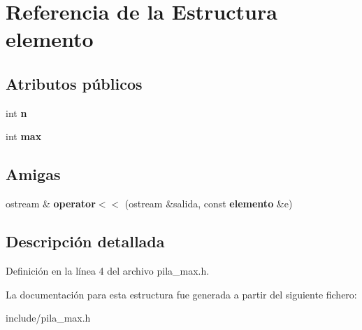 \section{Referencia de la Estructura elemento}
\label{structelemento}
\subsection*{Atributos públicos}
\begin{DoxyCompactItemize}
\item 
\label{structelemento_a0db819125f29dfafa6df3f899e5e0c81} 
int {\bfseries n}
\item 
\label{structelemento_ad788dc2f06ae38ba1c1a3fbe5464443d} 
int {\bfseries max}
\end{DoxyCompactItemize}
\subsection*{Amigas}
\begin{DoxyCompactItemize}
\item 
\label{structelemento_ad286bdbd3fbbc3639c5870ac7141513b} 
ostream \& {\bfseries operator$<$$<$} (ostream \&salida, const {\bf elemento} \&e)
\end{DoxyCompactItemize}


\subsection{Descripción detallada}


Definición en la línea 4 del archivo pila\+\_\+max.\+h.



La documentación para esta estructura fue generada a partir del siguiente fichero\+:\begin{DoxyCompactItemize}
\item 
include/pila\+\_\+max.\+h\end{DoxyCompactItemize}
